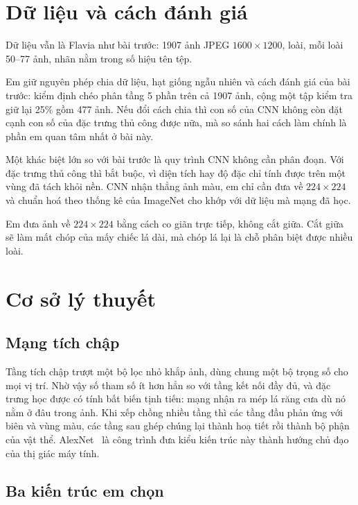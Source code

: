 \documentclass[11pt,a4paper]{article}
\begin{document}
\section{Dữ liệu và cách đánh giá}

Dữ liệu vẫn là Flavia như bài trước: 1907 ảnh JPEG $1600\times1200$, \nclasses{} loài, mỗi loài
50--77 ảnh, nhãn nằm trong số hiệu tên tệp.

Em giữ nguyên phép chia dữ liệu, hạt giống ngẫu nhiên và cách đánh giá của bài trước: kiểm định chéo
phân tầng 5 phần trên cả 1907 ảnh, cộng một tập kiểm tra giữ lại 25\% gồm 477 ảnh. Nếu đổi cách chia
thì con số của CNN không còn đặt cạnh con số của đặc trưng thủ công được nữa, mà so sánh hai cách
làm chính là phần em quan tâm nhất ở bài này.

Một khác biệt lớn so với bài trước là quy trình CNN không cần phân đoạn. Với đặc trưng thủ công thì
bắt buộc, vì diện tích hay độ đặc chỉ tính được trên một vùng đã tách khỏi nền. CNN nhận thẳng ảnh
màu, em chỉ cần đưa về $224\times224$ và chuẩn hoá theo thống kê của ImageNet cho khớp với dữ liệu
mà mạng đã học.

Em đưa ảnh về $224\times224$ bằng cách co giãn trực tiếp, không cắt giữa. Cắt giữa sẽ làm mất chóp
của mấy chiếc lá dài, mà chóp lá lại là chỗ phân biệt được nhiều loài.

\section{Cơ sở lý thuyết}

\subsection{Mạng tích chập}

Tầng tích chập trượt một bộ lọc nhỏ khắp ảnh, dùng chung một bộ trọng số cho mọi vị trí. Nhờ vậy số
tham số ít hơn hẳn so với tầng kết nối đầy đủ, và đặc trưng học được có tính bất biến tịnh tiến:
mạng nhận ra mép lá răng cưa dù nó nằm ở đâu trong ảnh. Khi xếp chồng nhiều tầng thì các tầng đầu
phản ứng với biên và vùng màu, các tầng sau ghép chúng lại thành hoạ tiết rồi thành bộ phận của vật
thể. AlexNet~\cite{krizhevsky2012} là công trình đưa kiểu kiến trúc này thành hướng chủ đạo của thị
giác máy tính.

\subsection{Ba kiến trúc em chọn}
\end{document}
